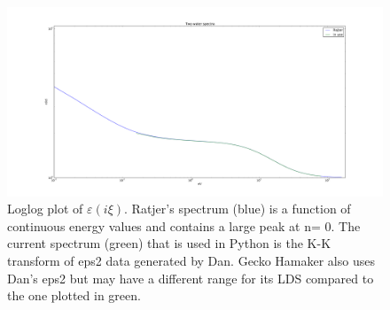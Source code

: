 \documentclass[onecolumn,letterpaper,amsmath,amssymb,floatfix,aps,superscriptaddress]{revtex4}
\begin{document}
\begin{figure}
\centerline{\includegraphics[width=17cm]{two_water_LDS.pdf}}
\caption{Loglog plot of $\varepsilon(i\xi)$. Ratjer's spectrum (blue) is a
function of continuous energy values and contains a
large peak at n= 0. The current spectrum (green) that is used in Python is the
K-K transform of eps2 data generated by Dan.  Gecko Hamaker also uses Dan's eps2
but may have a different range for its LDS compared to the one plotted in green.}
\label{fig:2xLDS}
\end{figure}
%
%
%
\end{document}
